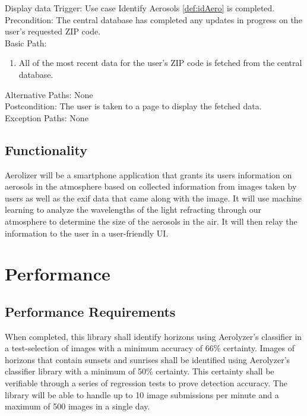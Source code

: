 \documentclass[journal,10pt,draftclsnofoot,onecolumn]{IEEEtran}
\makeatletter
\renewcommand\subsubsection{\@startsection{subsubsection}{3}{\z@}
                                     {-3.25ex\@plus -1ex \@minus -.2ex}
                                     {-1.5ex \@plus -.2ex}
                                     {\normalfont\normalsize\bfseries}}
\makeatother
\begin{document}
\begin{singlespace}
\begin{enumerate}
		\subsubsection{Display data}
			Trigger: Use case Identify Aerosols \ref{def:idAero} is completed.\\
			Precondition: The central database has completed any updates in progress on the user's requested ZIP code.\\
			Basic Path:
			\begin{enumerate}
				\item All of the most recent data for the user's ZIP code is fetched from the central database.
			\end{enumerate}
			Alternative Paths: None\\
			Postcondition: The user is taken to a page to display the fetched data.\\
			Exception Paths: None

	\subsection{Functionality}
		Aerolizer will be a smartphone application that grants its users information on aerosols in the atmosphere based on collected information from images taken by users as well as the exif data that came along with the image.
		It will use machine learning to analyze the wavelengths of the light refracting through our atmosphere to determine the size of the aerosols in the air. It will then relay the information to the user in a user-friendly UI. 

\clearpage

\section{Performance}
	\subsection{Performance Requirements}
		When completed, this library shall identify horizons using Aerolyzer's classifier in a test-selection of images with a minimum accuracy of 66\% certainty.
		Images of horizons that contain sunsets and sunrises shall be identified using Aerolyzer's classifier library with a minimum of 50\% certainty.
		This certainty shall be verifiable through a series of regression tests to prove detection accuracy.
		The library will be able to handle up to 10 image submissions per minute and a maximum of 500 images in a single day.


\end{enumerate}
\end{singlespace}
\end{document}
